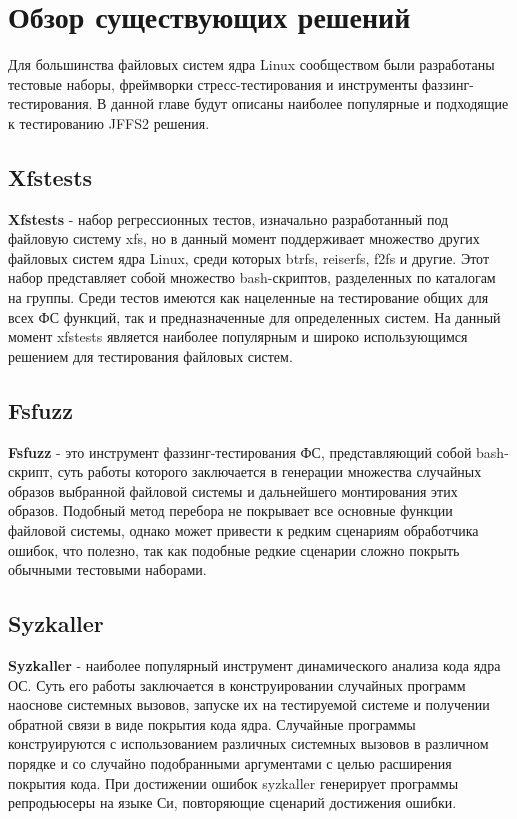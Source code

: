 \section{Обзор существующих решений}
\label{sec:Chapter2} 

Для большинства файловых систем ядра Linux сообществом были разработаны тестовые наборы, фреймворки стресс-тестирования и инструменты фаззинг-тестирования. В данной главе будут описаны наиболее популярные и подходящие к тестированию JFFS2 решения.

\subsection{Xfstests}

\textbf{Xfstests} - набор регрессионных тестов, изначально разработанный под файловую систему xfs, но в данный момент поддерживает множество других файловых систем ядра Linux, среди которых btrfs, reiserfs, f2fs и другие. Этот набор представляет собой множество bash-скриптов, разделенных по каталогам на группы. Среди тестов имеются как нацеленные на тестирование общих для всех ФС функций, так и предназначенные для определенных систем. На данный момент xfstests является наиболее популярным и широко использующимся решением для тестирования файловых систем.

\subsection{Fsfuzz}

\textbf{Fsfuzz} - это инструмент фаззинг-тестирования ФС, представляющий собой bash-скрипт, суть работы которого заключается в генерации множества случайных образов выбранной файловой системы и дальнейшего монтирования этих образов. Подобный метод перебора не покрывает все основные функции файловой системы, однако может привести к редким сценариям обработчика ошибок, что полезно, так как подобные редкие сценарии сложно покрыть обычными тестовыми наборами.

\subsection{Syzkaller}

\textbf{Syzkaller} - наиболее популярный инструмент динамического анализа кода ядра ОС. Суть его работы заключается в конструировании случайных программ наоснове системных вызовов, запуске их на тестируемой системе и получении обратной связи в виде покрытия кода ядра. Случайные программы конструируются с использованием различных системных вызовов в различном порядке и со случайно подобранными аргументами с целью расширения покрытия кода. При достижении ошибок syzkaller генерирует программы репродьюсеры на языке Си, повторяющие сценарий достижения ошибки.

